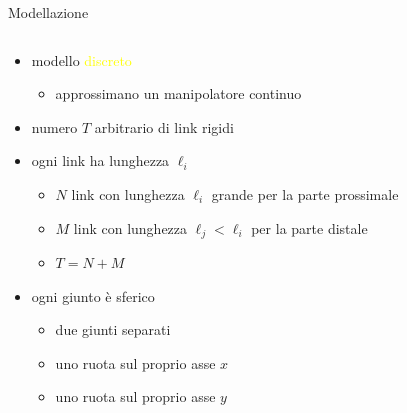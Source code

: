 
\begin{frame}{Modellazione}
\begin{columns}

\begin{column}{0.5\textwidth}
\begin{itemize}
    \item<1-> modello \textcolor{yellow}{discreto}
    \begin{itemize}
        \item<2-> approssimano un manipolatore continuo
    \end{itemize}
    \item<3-> numero $T$ arbitrario di link rigidi
    \item<4-> ogni link ha lunghezza $\ell_i$
    \begin{itemize}
        \item<5-> $N$ link con lunghezza $\ell_i$ grande per la parte prossimale
        \item<6-> $M$ link con lunghezza $\ell_j < \ell_i$ per la parte distale
        \item<6-> $T=N+M$
    \end{itemize}
    \item<7-> ogni giunto è sferico
    \begin{itemize}
        \item<8-> due giunti separati
        \item<9-> uno ruota sul proprio asse $x$
        \item<10-> uno ruota sul proprio asse $y$
    \end{itemize}
\end{itemize}
\end{column}


\end{columns}
\end{frame}
